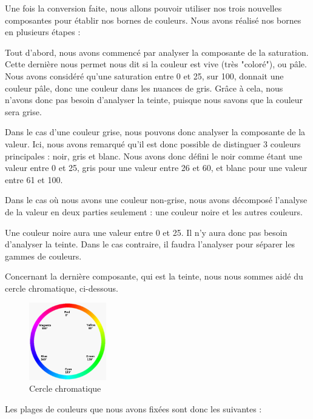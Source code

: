 \documentclass[12pt,titlepage,french]{article}
\begin{document}
Une fois la conversion faite, nous allons pouvoir utiliser nos trois nouvelles composantes pour établir nos bornes de couleurs. Nous avons réalisé nos bornes en plusieurs étapes : \newline

Tout d'abord, nous avons commencé par analyser la composante de la saturation. Cette dernière nous permet nous dit si la couleur est vive (très "coloré"), ou pâle. Nous avons considéré qu'une saturation entre 0 et 25, sur 100, donnait une couleur pâle, donc une couleur dans les nuances de gris. Grâce à cela, nous n'avons donc pas besoin d'analyser la teinte, puisque nous savons que la couleur sera grise. \newline

Dans le cas d'une couleur grise, nous pouvons donc analyser la composante de la valeur. Ici, nous avons remarqué qu'il est donc possible de distinguer 3 couleurs principales : noir, gris et blanc. Nous avons donc défini le noir comme étant une valeur entre 0 et 25, gris pour une valeur entre 26 et 60, et blanc pour une valeur entre 61 et 100. \newline

Dans le cas où nous avons une couleur non-grise, nous avons décomposé l'analyse de la valeur en deux parties seulement : une couleur noire et les autres couleurs. \newline

Une couleur noire aura une valeur entre 0 et 25. Il n'y aura donc pas besoin d'analyser la teinte. Dans le cas contraire, il faudra l'analyser pour séparer les gammes de couleurs. \newline

Concernant la dernière composante, qui est la teinte, nous nous sommes aidé du cercle chromatique, ci-dessous.

\begin{figure}[H]
\center
\includegraphics[width=0.3\textwidth]{./img/cercle_chromatique.png}
\caption{\label{} Cercle chromatique}
\end{figure}

Les plages de couleurs que nous avons fixées sont donc les suivantes :
\end{document}
